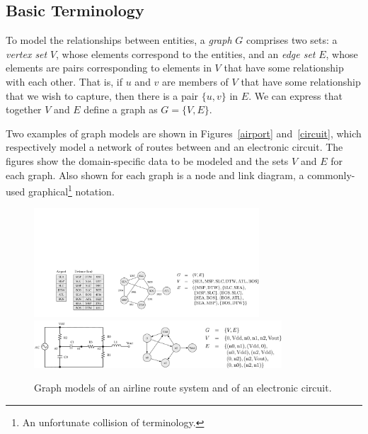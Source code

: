 \subsection{Basic Terminology}

To model the relationships between entities, a \emph{graph} $G$ comprises two sets:
a \emph{vertex set} $V$, whose elements correspond to the entities, and an \emph{edge set} $E$, whose
elements are pairs corresponding to elements in $V$ that have some relationship with each other.  That is,
if $u$ and $v$ are members of $V$ that have some relationship that we wish to capture, then there is
a pair $\{u, v\}$ in $E$.  We can express that together $V$ and $E$ define a graph as $G=\{V, E\}$.

Two examples of graph models are shown in Figures~\ref{airport} and~\ref{circuit},
which respectively model a network of routes between and an electronic circuit.  
The figures show the domain-specific data to be modeled and the sets $V$ and $E$ for each graph.
Also shown for each graph is a
 node and link diagram, a commonly-used graphical\footnote{An unfortunate collision of terminology.}
notation.

\begin{figure}[ht]
  \begin{center}
    {\includegraphics[width=0.75\textwidth]{figs/airport-summary.pdf}}
    \\
    {\includegraphics[width=0.825\textwidth]{figs/circuit-summary.pdf}}
    \caption{Graph models of an airline route system and of an electronic circuit.\label{fig:node_link_graphs}}
  \end{center}
\end{figure}


